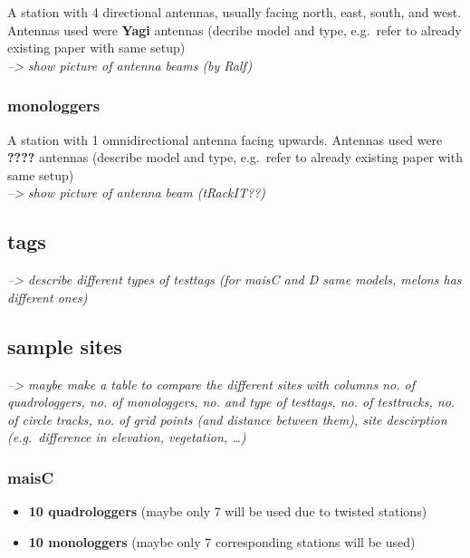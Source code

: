 \documentclass[
  letterpaper,
  DIV=11,
  numbers=noendperiod]{scrartcl}
\providecommand{\tightlist}{%
  \setlength{\itemsep}{0pt}\setlength{\parskip}{0pt}}\usepackage{longtable,booktabs,array}
\begin{document}
A station with 4 directional antennas, usually facing north, east,
south, and west. Antennas used were \textbf{Yagi} antennas (decribe
model and type, e.g.~refer to already existing paper with same setup)\\
\emph{--\textgreater{} show picture of antenna beams (by Ralf)}

\hypertarget{monologgers}{%
\subsubsection{monologgers}\label{monologgers}}

A station with 1 omnidirectional antenna facing upwards. Antennas used
were \textbf{????} antennas (describe model and type, e.g.~refer to
already existing paper with same setup)\\
\emph{--\textgreater{} show picture of antenna beam (tRackIT??)}

\hypertarget{tags}{%
\subsection{tags}\label{tags}}

\emph{--\textgreater{} describe different types of testtags (for maisC
and D same models, melons has different ones)}

\hypertarget{sample-sites}{%
\subsection{sample sites}\label{sample-sites}}

\emph{--\textgreater{} maybe make a table to compare the different sites
with columns no. of quadrologgers, no. of monologgers, no. and type of
testtags, no. of testtracks, no. of circle tracks, no. of grid points
(and distance between them), site descirption (e.g.~difference in
elevation, vegetation, \ldots)}

\hypertarget{maisc}{%
\subsubsection{maisC}\label{maisc}}

\begin{itemize}
\tightlist
\item
  \textbf{10 quadrologgers} (maybe only 7 will be used due to twisted
  stations)\\
\item
  \textbf{10 monologgers} (maybe only 7 corresponding stations will be
  used)
\end{itemize}
\end{document}
